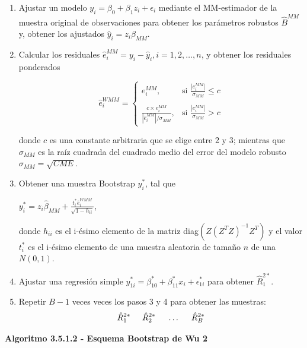\begin{enumerate}
	\item  Ajustar un modelo $y_{i} = \beta_{0} +\beta_{1}z_{i} + \epsilon_{i}$  mediante el MM-estimador de la muestra original de observaciones para obtener los parámetros robustos $\hat{B}^{MM}$ y, obtener los ajustados $\hat{y}_{i}=z_{i}\hat{\beta}_{MM}$.
	
	\item  Calcular los residuales $ \hat{e}^{MM}_{i} = y_{i}-\hat{y}_{i},i = 1,2, \dots, n$, y obtener los residuales ponderados
	\begin{center}
	{\large\[
	\hat{e}^{WMM}_{i} =
	\begin{cases}
		e^{MM}_{i}, & \text{si } \frac{|e^{MM}_{i}|}{\sigma_{MM}} \leq c \\ \\
		\frac{c \times e^{MM}_{i}}{ | \hat{e}^{MM}_{i} | /\sigma_{MM}},     & \text{si } \frac{|e^{MM}_{i}|}{\sigma_{MM}} > c
	\end{cases}
	\]}
	\end{center} 
	donde $c$ es una constante arbitraria que se elige entre 2 y 3; mientras que $\sigma_{MM}$ es la
	raíz cuadrada del cuadrado medio del error del modelo robusto $\sigma_{MM} = \sqrt{CME}$.

	\item Obtener una muestra Bootstrap $y^{*}_{i}$, tal que 
	\begin{center}
		{\large$y^{*}_{i} =z_{i}\hat{\beta}_{MM} + \frac{t^{*}_{i}\hat{e}^{WMM}_{i}}{\sqrt{1-h_{ii}}} $},
	\end{center}
	donde $h_{ii}$ es el i-ésimo elemento de la matriz diag$(Z(Z^{T}Z)^{-1} Z^{T})$ y el valor $t^{*}_{i}$ es el
	i-ésimo elemento de una muestra aleatoria de tamaño $n$ de una $N(0,1)$.
	
	\item  Ajustar una regresión simple $ y^{*}_{1i} = \beta^{*}_{10} +\beta^{*}_{11}x_{i} + \epsilon^{*}_{1i} $ para obtener $ \hat{R}^{2*}_{1} $.
	
		\item Repetir $B - 1$ veces veces los pasos 3 y 4 para obtener las muestras:
	\[
	\hat{R}^{2*}_{1} \hspace{.5cm} \hat{R}^{2*}_{2} \hspace{.5cm} \dots \hspace{.5cm} \hat{R}^{2*}_{B}
	\]
\end{enumerate}


\textbf{Algoritmo 3.5.1.2 - Esquema Bootstrap de Wu 2}

